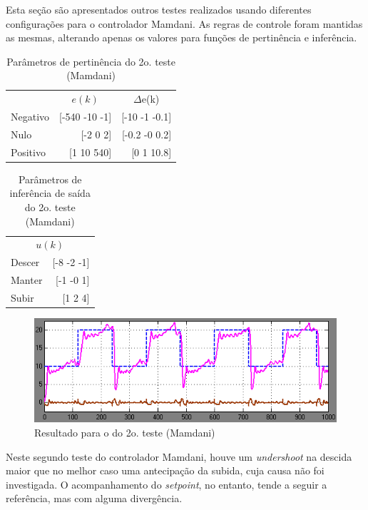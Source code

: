 \documentclass[
	twoside,				%
	twocolumn,				%
	english,				%
	brazil,					%
]{article}
\begin{document}
Esta seção são apresentados outros testes realizados usando diferentes configurações para o controlador Mamdani. As regras de controle foram mantidas as mesmas, alterando apenas os valores para funções de pertinência e inferência.

\begin{table}[!h]
\caption{Parâmetros de pertinência do 2o. teste \\ (Mamdani)}
\centering
\begin{tabular}{lrr}
\toprule
& \multicolumn{1}{c}{$e(k)$} & \multicolumn{1}{c}{$\Delta$e(k)} \\
\cmidrule(r){1-3} 
Negativo & [-540 -10 -1] & [-10 -1 -0.1] \\
Nulo & [-2 0 2] & [-0.2 -0 0.2] \\
Positivo & [1 10 540] & [0 1 10.8] \\
\bottomrule
\end{tabular}
\end{table}

\begin{table}[!h]
\caption{Parâmetros de inferência de saída do 2o. teste \\ (Mamdani)}
\centering
\begin{tabular}{lr}
\toprule
\multicolumn{2}{c}{$u(k)$} \\
\cmidrule(r){1-2}
Descer & [-8 -2 -1] \\
Manter & [-1 -0 1] \\
Subir & [1 2 4] \\
\bottomrule
\end{tabular}
\end{table}

\begin{figure}[!h]
    \centering
    \includegraphics[width=\columnwidth]{mamdani2.png}
    \caption { Resultado para o do 2o. teste (Mamdani)}
\end{figure}

Neste segundo teste do controlador Mamdani, houve um \textit{undershoot} na descida maior que no melhor caso uma antecipação da subida, cuja causa não foi investigada. O acompanhamento do \textit{setpoint}, no entanto, tende a seguir a referência, mas com alguma divergência.
\end{document}
